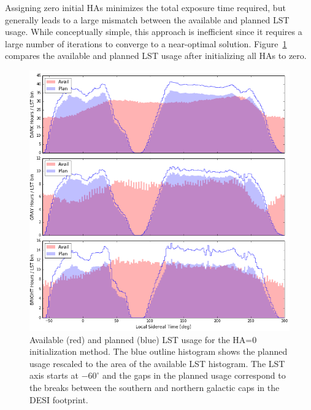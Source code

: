 \documentclass[12pt]{article}
\providecommand{\fig}[1]{Figure~\ref{fig:#1}}
\begin{document}
Assigning zero initial HAs minimizes the total exposure time required, but generally leads to a large mismatch between the available and planned LST usage. While conceptually simple, this approach is inefficient since it requires a large number of iterations to converge to a near-optimal solution. \fig{LST_zero0} compares the available and planned LST usage after initializing
all HAs to zero.

\begin{figure}[htb]
\begin{center}
\includegraphics[width=6in]{LST_zero0}
\caption{Available (red) and planned (blue) LST usage for the HA=0 initialization method.  The blue outline histogram shows the planned usage rescaled to the area of the available LST histogram.  The LST axis starts at $-60^\circ$ and the gaps in the planned usage correspond to the breaks between the southern and northern galactic caps in the DESI footprint.}
\label{fig:LST_zero0}
\end{center}
\end{figure}
\end{document}
